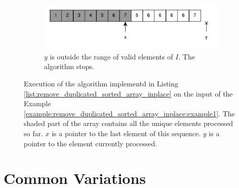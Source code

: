 \begin{figure}
\begin{subfigure}[t]{0.49\textwidth}
	 \end{subfigure}
	 \hfill
	 \begin{subfigure}[t]{0.49\textwidth}
		\includegraphics[width=1\linewidth]{sources/remove_duplicated_sorted_array_inplace/images/example1_15}
		\vspace*{-8mm}
		\caption{$y$ is outside the range of valid elements of $I$. The algorithm stops.}
		\label{fig:remove_duplicated_sorted_array_inplace:example1_6}
	 \end{subfigure}
\caption{Execution of the algorithm implementd in Listing
 \ref{list:remove_duplicated_sorted_array_inplace} on the input of the Example
 \ref{example:remove_duplicated_sorted_array_inplace:example1}. The shaded part of the array
 contains all the unique elements processed so far. $x$ is a pointer to the last element of this
 sequence. $y$ is a pointer to the element currently processed.}
\label{fig:remove_duplicated_sorted_array_inplace:example1_process}
\end{figure}

\section{Common Variations}
